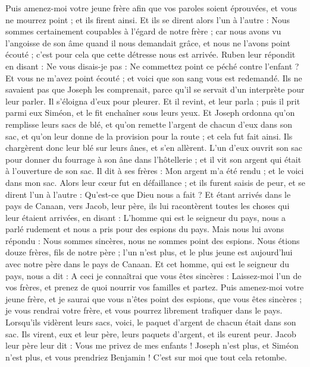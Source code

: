 \begin{multicols}{2}
Puis amenez-moi votre jeune frère afin que vos paroles soient éprouvées, et vous ne mourrez point ; et ils firent ainsi.
Et ils se dirent alors l'un à l'autre : Nous sommes certainement coupables à l'égard de notre frère ; car nous avons vu l'angoisse de son âme quand il nous demandait grâce, et nous ne l'avons point écouté ; c'est pour cela que cette détresse nous est arrivée.
Ruben leur répondit en disant : Ne vous disais-je pas : Ne commettez point ce péché contre l'enfant ? Et vous ne m'avez point écouté ; et voici que son sang vous est redemandé.
Ils ne savaient pas que Joseph les comprenait, parce qu'il se servait d'un interprète pour leur parler.
Il s'éloigna d'eux pour pleurer. Et il revint, et leur parla ; puis il prit parmi eux Siméon, et le fit enchaîner sous leurs yeux.
Et Joseph ordonna qu'on remplisse leurs sacs de blé, et qu'on remette l'argent de chacun d'eux dans son sac, et qu'on leur donne de la provision pour la route ; et cela fut fait ainsi.
Ils chargèrent donc leur blé sur leurs ânes, et s'en allèrent.
L'un d'eux ouvrit son sac pour donner du fourrage à son âne dans l'hôtellerie ; et il vit son argent qui était à l'ouverture de son sac.
Il dit à ses frères : Mon argent m'a été rendu ; et le voici dans mon sac. Alors leur cœur fut en défaillance ; et ils furent saisis de peur, et se dirent l'un à l'autre : Qu'est-ce que Dieu nous a fait ?
Et étant arrivés dans le pays de Canaan, vers Jacob, leur père, ils lui racontèrent toutes les choses qui leur étaient arrivées, en disant :
L'homme qui est le seigneur du pays, nous a parlé rudement et nous a pris pour des espions du pays.
Mais nous lui avons répondu : Nous sommes sincères, nous ne sommes point des espions.
Nous étions douze frères, fils de notre père ; l'un n'est plus, et le plus jeune est aujourd'hui avec notre père dans le pays de Canaan.
Et cet homme, qui est le seigneur du pays, nous a dit : A ceci je connaîtrai que vous êtes sincères : Laissez-moi l'un de vos frères, et prenez de quoi nourrir vos familles et partez.
Puis amenez-moi votre jeune frère, et je saurai que vous n'êtes point des espions, que vous êtes sincères ; je vous rendrai votre frère, et vous pourrez librement trafiquer dans le pays.
Lorsqu'ils vidèrent leurs sacs, voici, le paquet d'argent de chacun était dans son sac. Ils virent, eux et leur père, leurs paquets d'argent, et ils eurent peur.
Jacob leur père leur dit : Vous me privez de mes enfants ! Joseph n'est plus, et Siméon n'est plus, et vous prendriez Benjamin ! C'est sur moi que tout cela retombe.

\end{multicols}
